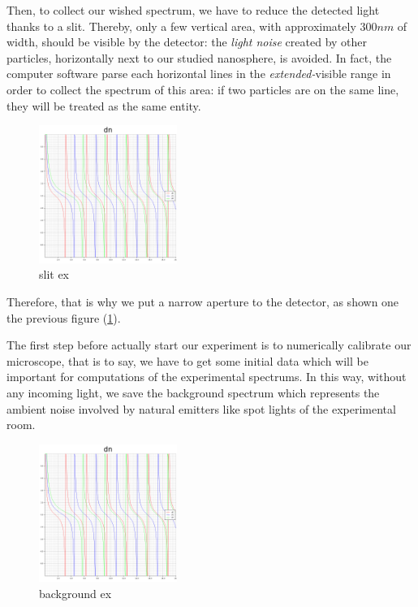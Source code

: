 \documentclass{article}
\numberwithin{equation}{section}
\begin{document}
Then, to collect our wished spectrum, we have to reduce the detected light thanks to a slit. Thereby, only a few vertical area, with approximately $300 nm$ of width, should be visible by the detector: the \textit{light noise} created by other particles, horizontally next to our studied nanosphere, is avoided. In fact, the computer software parse each horizontal lines in the \textit{extended-}visible range in order to collect the spectrum of this area: if two particles are on the same line, they will be treated as the same entity.
\begin{figure}[h]
    \centering
    \includegraphics[width=0.4\textwidth, height=0.35\textwidth]{dn.png}
    \caption{slit ex}
    \label{fig:slit_ex}
\end{figure}
Therefore, that is why we put a narrow aperture to the detector, as shown one the previous figure (\ref{fig:slit_ex}).

The first step before actually start our experiment is to numerically calibrate our microscope, that is to say, we have to get some initial data which will be important for computations of the experimental spectrums. In this way, without any incoming light, we save the background spectrum which represents the ambient noise involved by natural emitters like spot lights of the experimental room.
\begin{figure}[h]
    \centering
    \includegraphics[width=0.4\textwidth, height=0.35\textwidth]{dn.png}
    \caption{background ex}
    \label{fig:background_ex}
\end{figure}
\end{document}

